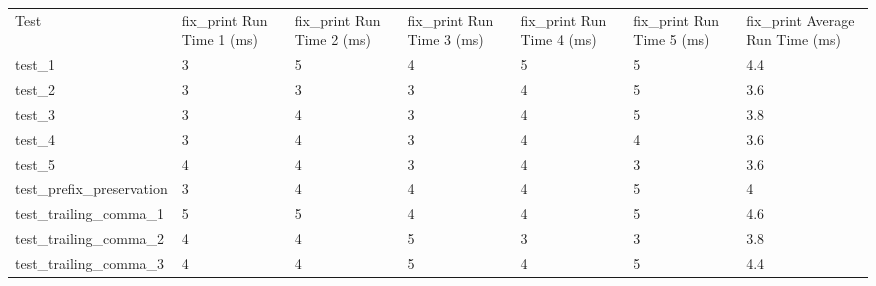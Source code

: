 \begin{table}[]
    \begin{tabular}{@{}lllllll@{}}
    \cmidrule(r){1-6}
    Test                                  & fix\_print Run Time 1 (ms) & fix\_print Run Time 2 (ms) & fix\_print Run Time 3 (ms) & fix\_print Run Time 4 (ms) & fix\_print Run Time 5 (ms) & fix\_print Average Run Time (ms) \\ \cmidrule(r){1-6}
    test\_1                               & 3                          & 5                          & 4                          & 5                          & 5                          & 4.4                              \\
    test\_2                               & 3                          & 3                          & 3                          & 4                          & 5                          & 3.6                              \\
    test\_3                               & 3                          & 4                          & 3                          & 4                          & 5                          & 3.8                              \\ \cmidrule(r){1-6}
    test\_4                               & 3                          & 4                          & 3                          & 4                          & 4                          & 3.6                              \\
    test\_5                               & 4                          & 4                          & 3                          & 4                          & 3                          & 3.6                              \\
    test\_prefix\_preservation            & 3                          & 4                          & 4                          & 4                          & 5                          & 4                                \\
    test\_trailing\_comma\_1              & 5                          & 5                          & 4                          & 4                          & 5                          & 4.6                              \\
    test\_trailing\_comma\_2              & 4                          & 4                          & 5                          & 3                          & 3                          & 3.8                              \\
    test\_trailing\_comma\_3              & 4                          & 4                          & 5                          & 4                          & 5                          & 4.4                              \\

\end{tabular}
\end{table}
